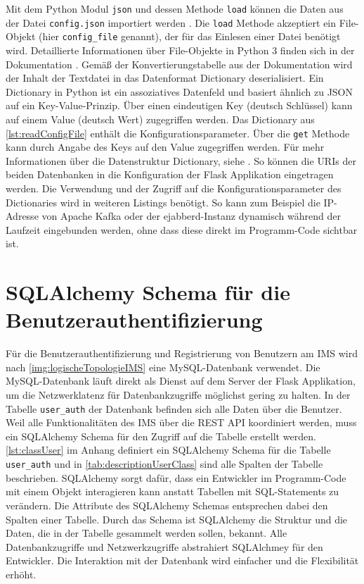 \documentclass[a4paper,titlepage,halfparskip,12pt]{scrreprt}
\begin{document}
\begin{onehalfspacing}
Mit dem Python Modul \texttt{json} und dessen Methode \texttt{load} können die Daten aus der Datei \texttt{config.json} importiert werden \cite{pythonJSONapi}. Die \texttt{load} Methode akzeptiert ein File-Objekt (hier \texttt{config\_file} genannt), der für das Einlesen einer Datei benötigt wird. Detaillierte Informationen über File-Objekte in Python 3 finden sich in der Dokumentation \cite{usageFileDeskr}. Gemäß der Konvertierungstabelle aus der Dokumentation \cite{pythonJSONapi} wird der Inhalt der Textdatei in das Datenformat Dictionary deserialisiert. Ein Dictionary in Python ist ein assoziatives Datenfeld und basiert ähnlich zu \ac{JSON} auf ein Key-Value-Prinzip. Über einen eindeutigen Key (deutsch Schlüssel) kann auf einem Value (deutsch Wert) zugegriffen werden. Das Dictionary aus \autoref{lst:readConfigFile} enthält die Konfigurationsparameter. Über die \texttt{get} Methode kann durch Angabe des Keys auf den Value zugegriffen werden. Für mehr Informationen über die Datenstruktur Dictionary, siehe \cite{pythonDictionaries}. So können die \acs{URI}s der beiden Datenbanken in die Konfiguration der Flask Applikation eingetragen werden.  Die Verwendung und der Zugriff auf die Konfigurationsparameter des Dictionaries wird in weiteren Listings benötigt. So kann zum Beispiel die IP-Adresse von Apache Kafka oder der ejabberd-Instanz dynamisch während der Laufzeit eingebunden werden, ohne dass diese direkt im Programm-Code sichtbar ist.

\section{SQLAlchemy Schema für die Benutzerauthentifizierung}

Für die Benutzerauthentifizierung und Registrierung von Benutzern am \acs{IMS} wird nach \autoref{img:logischeTopologieIMS} eine MySQL-Datenbank verwendet. Die MySQL-Datenbank läuft direkt als Dienst auf dem Server der Flask Applikation, um die Netzwerklatenz für Datenbankzugriffe möglichst gering zu halten. In der Tabelle \texttt{user\_auth} der Datenbank befinden sich alle Daten über die Benutzer. Weil alle Funktionalitäten des \acs{IMS} über die \acs{REST} \acs{API} koordiniert werden, muss ein SQLAlchemy Schema für den Zugriff auf die Tabelle erstellt werden. \autoref{lst:classUser} im Anhang definiert ein SQLAlchemy Schema für die Tabelle \texttt{user\_auth} und in \autoref{tab:descriptionUserClass} sind alle Spalten der Tabelle beschrieben. SQLAlchemy sorgt dafür, dass ein Entwickler im Programm-Code mit einem Objekt interagieren kann anstatt Tabellen mit SQL-Statements zu verändern. Die Attribute des SQLAlchemy Schemas entsprechen dabei den Spalten einer Tabelle. Durch das Schema ist SQLAlchemy die Struktur und die Daten, die in der Tabelle gesammelt werden sollen, bekannt. Alle Datenbankzugriffe und Netzwerkzugriffe abstrahiert SQLAlchmey für den Entwickler. Die Interaktion mit der Datenbank wird einfacher und die Flexibilität erhöht.


\end{onehalfspacing}
\end{document}
